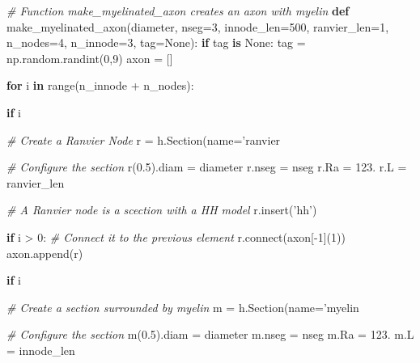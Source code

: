 \documentclass[]{article}
\newenvironment{Shaded}{}{}
\newcommand{\BuiltInTok}[1]{#1}
\newcommand{\CommentTok}[1]{\textcolor[rgb]{0.38,0.63,0.69}{\textit{#1}}}
\newcommand{\ControlFlowTok}[1]{\textcolor[rgb]{0.00,0.44,0.13}{\textbf{#1}}}
\newcommand{\DecValTok}[1]{\textcolor[rgb]{0.25,0.63,0.44}{#1}}
\newcommand{\ExtensionTok}[1]{#1}
\newcommand{\FloatTok}[1]{\textcolor[rgb]{0.25,0.63,0.44}{#1}}
\newcommand{\KeywordTok}[1]{\textcolor[rgb]{0.00,0.44,0.13}{\textbf{#1}}}
\newcommand{\NormalTok}[1]{#1}
\newcommand{\OperatorTok}[1]{\textcolor[rgb]{0.40,0.40,0.40}{#1}}
\newcommand{\SpecialCharTok}[1]{\textcolor[rgb]{0.25,0.44,0.63}{#1}}
\newcommand{\StringTok}[1]{\textcolor[rgb]{0.25,0.44,0.63}{#1}}
\newcommand{\VariableTok}[1]{\textcolor[rgb]{0.10,0.09,0.49}{#1}}
\begin{document}
\begin{Shaded}
\begin{Highlighting}[]
\CommentTok{# Function make_myelinated_axon creates an axon with myelin}
\KeywordTok{def}\NormalTok{ make_myelinated_axon(diameter, nseg}\OperatorTok{=}\DecValTok{3}\NormalTok{, innode_len}\OperatorTok{=}\DecValTok{500}\NormalTok{, ranvier_len}\OperatorTok{=}\DecValTok{1}\NormalTok{, n_nodes}\OperatorTok{=}\DecValTok{4}\NormalTok{, n_innode}\OperatorTok{=}\DecValTok{3}\NormalTok{, tag}\OperatorTok{=}\VariableTok{None}\NormalTok{):}
    \ControlFlowTok{if}\NormalTok{ tag }\KeywordTok{is} \VariableTok{None}\NormalTok{: }
\NormalTok{        tag }\OperatorTok{=}\NormalTok{ np.random.randint(}\DecValTok{0}\NormalTok{,}\DecValTok{9}\NormalTok{)}
\NormalTok{    axon }\OperatorTok{=}\NormalTok{ []}
    
    \ControlFlowTok{for}\NormalTok{ i }\KeywordTok{in} \BuiltInTok{range}\NormalTok{(n_innode }\OperatorTok{+}\NormalTok{ n_nodes): }

        \ControlFlowTok{if}\NormalTok{ i }\OperatorTok{%
            \CommentTok{# Create a Ranvier Node }
\NormalTok{            r }\OperatorTok{=}\NormalTok{ h.Section(name}\OperatorTok{=}\StringTok{'ranvier}\SpecialCharTok{%
            \CommentTok{# Configure the section }
\NormalTok{            r(}\FloatTok{0.5}\NormalTok{).diam }\OperatorTok{=}\NormalTok{ diameter}
\NormalTok{            r.nseg }\OperatorTok{=}\NormalTok{ nseg}
\NormalTok{            r.Ra }\OperatorTok{=} \FloatTok{123.}
\NormalTok{            r.L }\OperatorTok{=}\NormalTok{ ranvier_len}

            \CommentTok{# A Ranvier node is a scection with a HH model}
\NormalTok{            r.insert(}\StringTok{'hh'}\NormalTok{)}

            \ControlFlowTok{if}\NormalTok{ i }\OperatorTok{>} \DecValTok{0}\NormalTok{: }
                \CommentTok{# Connect it to the previous element}
\NormalTok{                r.}\ExtensionTok{connect}\NormalTok{(axon[}\OperatorTok{-}\DecValTok{1}\NormalTok{](}\DecValTok{1}\NormalTok{))}
\NormalTok{            axon.append(r)}
            
        \ControlFlowTok{if}\NormalTok{ i }\OperatorTok{%
            \CommentTok{# Create a section surrounded by myelin }
\NormalTok{            m }\OperatorTok{=}\NormalTok{ h.Section(name}\OperatorTok{=}\StringTok{'myelin}\SpecialCharTok{%
            \CommentTok{# Configure the section }
\NormalTok{            m(}\FloatTok{0.5}\NormalTok{).diam }\OperatorTok{=}\NormalTok{ diameter}
\NormalTok{            m.nseg }\OperatorTok{=}\NormalTok{ nseg}
\NormalTok{            m.Ra }\OperatorTok{=} \FloatTok{123.}
\NormalTok{            m.L }\OperatorTok{=}\NormalTok{ innode_len}

}}}}
\end{Highlighting}
\end{Shaded}
\end{document}
